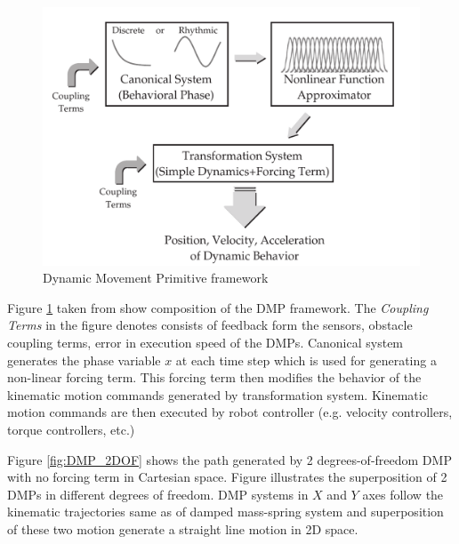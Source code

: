 \begin{figure}[H]
	\includegraphics[width=\textwidth]{images/dmp.png}
	\caption{Dynamic Movement Primitive framework \cite{ijspeert2013dynamical}}
	\label{fig:DMP_framework}
\end{figure}
Figure \ref{fig:DMP_framework} taken from \cite{ijspeert2013dynamical} show composition of the DMP framework. The \textit{Coupling Terms} in the figure denotes consists of feedback form the sensors, obstacle coupling terms, error in execution speed of the DMPs. Canonical system generates the phase variable $x$ at each time step which is used for generating a non-linear forcing term. This forcing term then modifies the behavior of the kinematic motion commands generated by transformation system. Kinematic motion commands are then executed by robot controller (e.g. velocity controllers, torque controllers, etc.)

Figure \ref{fig:DMP_2DOF} shows the path generated by 2 degrees-of-freedom DMP with no forcing term in Cartesian space. Figure illustrates the superposition of 2 DMPs in different degrees of freedom. DMP systems in $X$ and $Y$ axes follow the kinematic trajectories same as of damped mass-spring system and superposition of these two motion generate a straight line motion in 2D space. 




